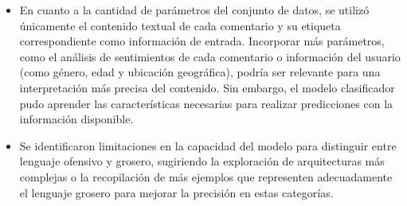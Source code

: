 \begin{itemize}
\item En cuanto a la cantidad de parámetros del conjunto de datos, se utilizó únicamente el contenido textual de cada comentario y su etiqueta correspondiente como información de entrada. Incorporar más parámetros, como el análisis de sentimientos de cada comentario o información del usuario (como género, edad y ubicación geográfica), podría ser relevante para una interpretación más precisa del contenido. Sin embargo, el modelo clasificador pudo aprender las características necesarias para realizar predicciones con la información disponible.

\item Se identificaron limitaciones en la capacidad del modelo para distinguir entre lenguaje ofensivo y grosero, sugiriendo la exploración de arquitecturas más complejas o la recopilación de más ejemplos que representen adecuadamente el lenguaje grosero para mejorar la precisión en estas categorías.

\end{itemize}







